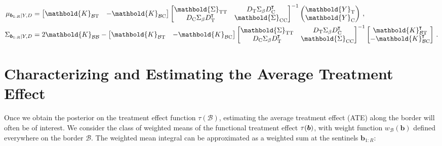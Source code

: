 \documentclass[letter]{article}
\DeclarePairedDelimiter{\parenthesis}{\lparen}{\rparen}
\newcommand{\del}[1]{\parenthesis*{#1}}
\newcommand*{\trans}{^{\mkern-1.5mu\intercal}}
\newcommand{\treat}{\mathrm{T}}
\newcommand{\ctrol}{\mathrm{C}}
\newcommand{\Yvec}{\mathbold{Y}}
\newcommand{\yt}{\Yvec_{\treat}}
\newcommand{\yc}{\Yvec_{\ctrol}}
\newcommand{\border}{\mathcal{B}}
\newcommand{\sentinel}{\bm{b}}
\newcommand{\numsent}{R}
\newcommand{\sentinels}{\sentinel_{1:\numsent}}
\newcommand{\weightb}{w_{\border}}
\newcommand{\Kmat}{\mathbold{K}}
\newcommand{\SigmaMat}{\mathbold{\Sigma}}
\newcommand{\KBB}{\Kmat_{\border \border}}
\newcommand{\KBT}{\Kmat_{\border \treat}}
\newcommand{\KBC}{\Kmat_{\border \ctrol}}
\newcommand{\STT}{\SigmaMat_{\treat \treat}}
\newcommand{\SCC}{\SigmaMat_{\ctrol \ctrol}}
\begin{document}
\begin{equation}
\begin{split}
    \mu_{\sentinels \mid Y, D} &= 
        \begin{bmatrix}
            \KBT & -\KBC
        \end{bmatrix}
        \begin{bmatrix}
            \STT & D_{\treat} \Sigma_\beta D_{\ctrol}\trans \\
            D_{\ctrol} \Sigma_\beta D_{\treat}\trans & \SCC
        \end{bmatrix}^{-1}
        \begin{pmatrix}
            \yt \\
            \yc
        \end{pmatrix}
        \,,\\
    \Sigma_{\sentinels \mid Y, D} &=
        2 \KBB -
        \begin{bmatrix}
            \KBT & -\KBC
        \end{bmatrix}
        \begin{bmatrix}
            \STT & D_{\treat} \Sigma_\beta D_{\ctrol}\trans \\
            D_{\ctrol} \Sigma_\beta D_{\treat}\trans & \SCC
        \end{bmatrix}^{-1}
        \begin{bmatrix}
            \KBT\trans \\ -\KBC\trans
        \end{bmatrix}
        \,.
\end{split}
\end{equation}
    


    	\section{Characterizing and Estimating the Average Treatment Effect}\label{characterizing-and-estimating-the-average-treatment-effect}
    


    	\label{sec:ate}
    


    	Once we obtain the posterior on the treatment effect function \(\tau(\border)\), estimating the average treatment effect (ATE) along the border will often be of interest.
We consider the class of weighted means of the functional treatment effect \(\tau\del{\sentinel}\),
with weight function \(\weightb(\sentinel)\) defined everywhere on the border \(\border\).
The weighted mean integral can be approximated as a weighted sum at the sentinels \(\sentinels\):
\end{document}
